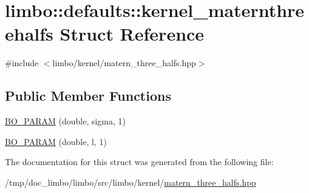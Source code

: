\hypertarget{structlimbo_1_1defaults_1_1kernel__maternthreehalfs}{}\section{limbo\+:\+:defaults\+:\+:kernel\+\_\+maternthreehalfs Struct Reference}
\label{structlimbo_1_1defaults_1_1kernel__maternthreehalfs}


{\ttfamily \#include $<$limbo/kernel/matern\+\_\+three\+\_\+halfs.\+hpp$>$}

\subsection*{Public Member Functions}
\begin{DoxyCompactItemize}
\item 
\hyperlink{group__kernel__defaults_ga59b38b1e10b24b9192a2f7ff05735186}{B\+O\+\_\+\+P\+A\+R\+A\+M} (double, sigma, 1)
\item 
\hyperlink{group__kernel__defaults_ga8764c13406e6fe0ab8f3c79d200c5e96}{B\+O\+\_\+\+P\+A\+R\+A\+M} (double, l, 1)
\end{DoxyCompactItemize}


The documentation for this struct was generated from the following file\+:\begin{DoxyCompactItemize}
\item 
/tmp/doc\+\_\+limbo/limbo/src/limbo/kernel/\hyperlink{matern__three__halfs_8hpp}{matern\+\_\+three\+\_\+halfs.\+hpp}\end{DoxyCompactItemize}
